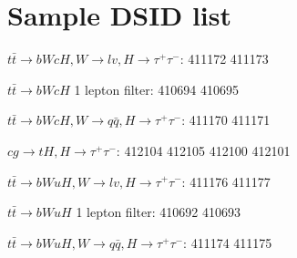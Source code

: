 \section{Sample DSID list}
\label{sec:DSIDlist}



$t\bar{t}\to bWcH, W\to lv, H\to\tau^+\tau^-$: 411172 411173

$t\bar{t}\to bWcH$ 1 lepton filter: 410694 410695

$t\bar{t}\to bWcH, W\to q\bar{q}, H\to\tau^+\tau^-$: 411170 411171

$cg\to tH, H\to\tau^+\tau^-$: 412104 412105 412100 412101

$t\bar{t}\to bWuH, W\to lv, H\to\tau^+\tau^-$: 411176 411177

$t\bar{t}\to bWuH$ 1 lepton filter: 410692 410693

$t\bar{t}\to bWuH, W\to q\bar{q}, H\to\tau^+\tau^-$: 411174 411175


